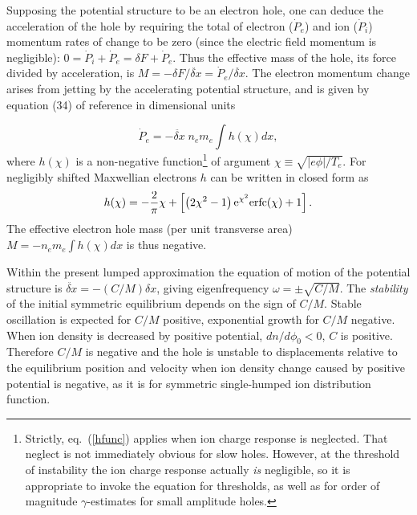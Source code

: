 \documentclass[12pt]{article}
\begin{document}
Supposing the potential structure to be an electron hole, one can
deduce the acceleration of the hole by requiring the total of electron
($\dot P_e$) and ion ($\dot P_i$) momentum rates of change to be zero
(since the electric field momentum is negligible):
$0=\dot P_i+\dot P_e=\delta F +\dot P_e$. Thus the effective mass of
the hole, its force divided by acceleration, is
$M=-\delta F/\ddot{\delta x}=\dot P_e/\ddot{\delta x}$. The electron
momentum change arises from jetting by the accelerating potential
structure, and is given by equation (34) of reference \cite{Hutchinson2016}
in dimensional units

\begin{equation}
  \dot P_e = - \ddot{\delta x}\;n_e m_e\int h(\chi) dx ,
\end{equation}
where $h(\chi)$ is a non-negative function\footnote{Strictly, eq.\
  (\ref{hfunc}) applies when ion charge response is neglected. That
  neglect is not immediately obvious for slow holes. However, at the
  threshold of instability the ion charge response actually \emph{is}
  negligible, so it is appropriate to invoke the equation for
  thresholds, as well as for order of magnitude $\gamma$-estimates for
  small amplitude holes.} of argument
$\chi\equiv\sqrt{|e\phi|/T_e}$. For negligibly shifted Maxwellian
electrons $h$ can be written in closed form as
\begin{equation}\label{hfunc}
  h(\chi)=-{2\over \pi}\chi +\left[\left(2\chi^2-1\right){\rm e}^{\chi^2}{\rm
      erfc}(\chi)+1  \right].
\end{equation}
The effective electron hole mass (per unit transverse area)
$M=- n_em_e \int h(\chi) dx$ is thus negative.

Within the present lumped approximation the equation of motion of the
potential structure is $\ddot{\delta x}=-(C/M)\delta x$, giving
eigenfrequency $\omega =\pm\sqrt{C/M}$. The \emph{stability} of the
initial symmetric equilibrium depends on the sign of $C/M$.  Stable
oscillation is expected for $C/M$ positive, exponential growth for
$C/M$ negative.  When ion density is decreased by positive
potential, $dn/d\phi_0<0$, $C$ is positive.  Therefore $C/M$ is negative
and the hole is unstable to displacements relative to the equilibrium
position and velocity when ion density change caused by positive
potential is negative, as it is for symmetric single-humped ion
distribution function.
\end{document}
